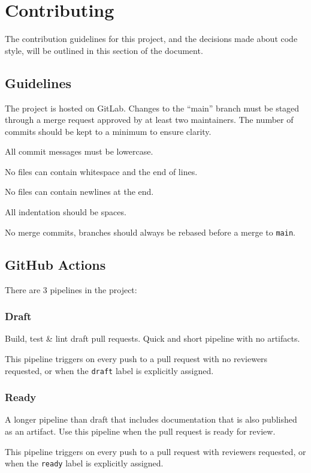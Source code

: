 \pagebreak


\section{Contributing}

The contribution guidelines for this project, and the decisions made about code style,
will be outlined in this section of the document.

\subsection{Guidelines}

The project is hosted on GitLab.
Changes to the ``main'' branch must be staged through a merge request approved by at least two maintainers.
The number of commits should be kept to a minimum to ensure clarity.

All commit messages must be lowercase.

No files can contain whitespace and the end of lines.

No files can contain newlines at the end.

All indentation should be spaces.

No merge commits, branches should always be rebased before a merge to \texttt{main}.

\subsection{GitHub Actions}

There are 3 pipelines in the project:
\subsubsection{Draft}
Build, test \& lint draft pull requests.
Quick and short pipeline with no artifacts.

This pipeline triggers on every push to a pull request with no reviewers requested, or when the \texttt{draft} label is explicitly assigned.
\subsubsection{Ready}
A longer pipeline than draft that includes documentation that is also published as an artifact.
Use this pipeline when the pull request is ready for review.

This pipeline triggers on every push to a pull request with reviewers requested, or when the \texttt{ready} label is explicitly assigned.

